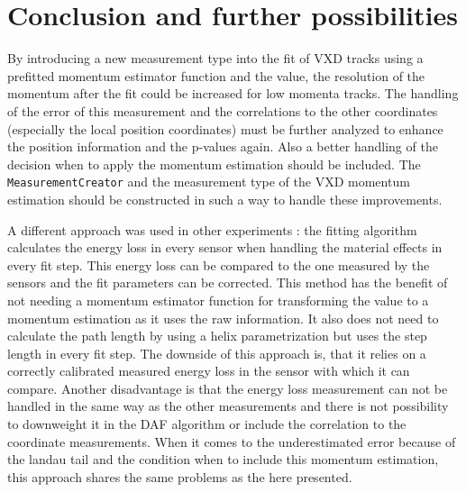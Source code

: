 \section{Conclusion and further possibilities}

By introducing a new measurement type into the fit of VXD tracks using a prefitted momentum estimator function and the \dedx value, the resolution of the momentum after the fit could be increased for low momenta tracks. The handling of the error of this measurement and the correlations to the other coordinates (especially the local position coordinates) must be further analyzed to enhance the position information and the p-values again. Also a better handling of the decision when to apply the momentum estimation should be included. The \texttt{MeasurementCreator} and the measurement type of the VXD momentum estimation should be constructed in such a way to handle these improvements.

A different approach was used in other experiments \cite{sergey}: the fitting algorithm calculates the energy loss in every sensor when handling the material effects in every fit step. This energy loss can be compared to the one measured by the sensors and the fit parameters can be corrected. This method has the benefit of not needing a momentum estimator function for transforming the \dedx value to a momentum estimation as it uses the raw \dedx information. It also does not need to calculate the path length by using a helix parametrization but uses the step length in every fit step. The downside of this approach is, that it relies on a correctly calibrated measured energy loss in the sensor with which it can compare. Another disadvantage is that the energy loss measurement can not be handled in the same way as the other measurements and there is not possibility to downweight it in the DAF algorithm or include the correlation to the coordinate measurements. When it comes to the underestimated error because of the landau tail and the condition when to include this momentum estimation, this approach shares the same problems as the here presented.

